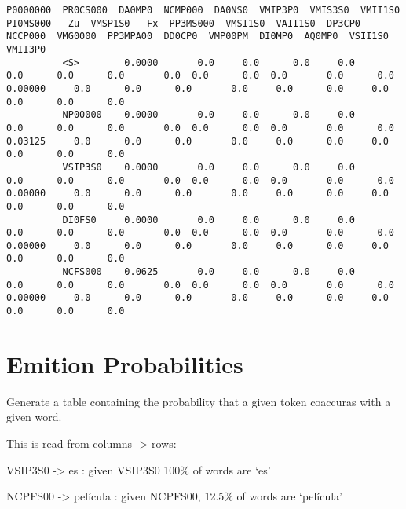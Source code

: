 \documentclass[11pt]{article}
\begin{document}
\begin{Verbatim}[commandchars=\\\{\}]
                   P0000000  PR0CS000  DA0MP0  NCMP000  DA0NS0  VMIP3P0  VMIS3S0  VMII1S0  PI0MS000   Zu  VMSP1S0   Fx  PP3MS000  VMSI1S0  VAII1S0  DP3CP0  NCCP000  VMG0000  PP3MPA00  DD0CP0  VMP00PM  DI0MP0  AQ0MP0  VSII1S0  VMII3P0  
          <S>        0.0000       0.0     0.0      0.0     0.0      0.0      0.0      0.0       0.0  0.0      0.0  0.0       0.0      0.0  0.00000     0.0      0.0      0.0       0.0     0.0      0.0     0.0     0.0      0.0      0.0  
          NP00000    0.0000       0.0     0.0      0.0     0.0      0.0      0.0      0.0       0.0  0.0      0.0  0.0       0.0      0.0  0.03125     0.0      0.0      0.0       0.0     0.0      0.0     0.0     0.0      0.0      0.0  
          VSIP3S0    0.0000       0.0     0.0      0.0     0.0      0.0      0.0      0.0       0.0  0.0      0.0  0.0       0.0      0.0  0.00000     0.0      0.0      0.0       0.0     0.0      0.0     0.0     0.0      0.0      0.0  
          DI0FS0     0.0000       0.0     0.0      0.0     0.0      0.0      0.0      0.0       0.0  0.0      0.0  0.0       0.0      0.0  0.00000     0.0      0.0      0.0       0.0     0.0      0.0     0.0     0.0      0.0      0.0  
          NCFS000    0.0625       0.0     0.0      0.0     0.0      0.0      0.0      0.0       0.0  0.0      0.0  0.0       0.0      0.0  0.00000     0.0      0.0      0.0       0.0     0.0      0.0     0.0     0.0      0.0      0.0  
\end{Verbatim}
            
    \hypertarget{emition-probabilities}{%
\section{Emition Probabilities}\label{emition-probabilities}}

Generate a table containing the probability that a given token coaccuras
with a given word.

This is read from columns -\textgreater{} rows:

VSIP3S0 -\textgreater{} es : given VSIP3S0 100\% of words are `es'

NCPFS00 -\textgreater{} película : given NCPFS00, 12.5\% of words are
`película'
\end{document}
